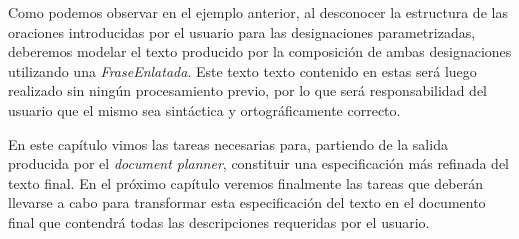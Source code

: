 Como podemos observar en el ejemplo anterior, al desconocer la estructura de las oraciones introducidas por el usuario para las designaciones parametrizadas, deberemos modelar el texto producido por la composición de ambas designaciones utilizando una \emph{FraseEnlatada}. Este texto texto contenido en estas será luego realizado sin ningún procesamiento previo, por lo que será responsabilidad del usuario que el mismo sea sintáctica y ortográficamente correcto.

\bigskip
En este capítulo vimos las tareas necesarias para, partiendo de la salida producida por el \textit{document planner}, constituir una especificación más refinada del texto final. En el próximo capítulo veremos finalmente las tareas que deberán llevarse a cabo para transformar esta especificación del texto en el documento final que contendrá todas las descripciones requeridas por el usuario.

